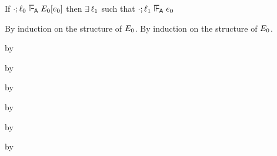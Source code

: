 \begin{lemma}\label{A-labeled-hole}
  If\/ $\snil; \sowner_0 \sWLA \ctx_0[\sexpr_0]$
  then\/ $\exists\,\ell_1$
  such that\/ $\snil; \sowner_1 \sWLA \sexpr_0$
\end{lemma}{
\newcommand{\shortproof}{By induction on the structure of $\ctx_0$.}
\begin{lamportproof*}
  \shortproof
\mainproof
  \shortproof

    \begin{pfproof}
      \qedstep
    \end{pfproof}

    \begin{pfproof}
      \qedstep
        \begin{pfproof}
          by \pfih
        \end{pfproof}
    \end{pfproof}

    \begin{pfproof}
      \qedstep
        \begin{pfproof}
          by \pfih
        \end{pfproof}
    \end{pfproof}

    \begin{pfproof}
      \qedstep
        \begin{pfproof}
          by \pfih
        \end{pfproof}
    \end{pfproof}

    \begin{pfproof}
      \qedstep
        \begin{pfproof}
          by \pfih
        \end{pfproof}
    \end{pfproof}

    \begin{pfproof}
      \qedstep
        \begin{pfproof}
          by \pfih
        \end{pfproof}
    \end{pfproof}

    \begin{pfproof}
      \qedstep
        \begin{pfproof}
          by \pfih
        \end{pfproof}
    \end{pfproof}


\end{lamportproof*}}

